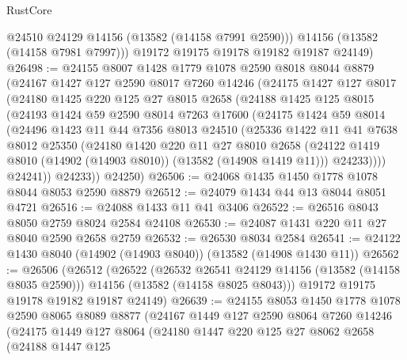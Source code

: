 \begin{lexlean}{RustCore}
\begin{coremodule}
          @24510
          @24129
          @14156
          (@13582 (@14158 @7991 @2590)))
        @14156
        (@13582 (@14158 @7981 @7997)))
      @19172
      @19175
      @19178
      @19182
      @19187
      @24149)
@26498 := @24155
    @8007
    @1428
    @1779
    @1078
    @2590
    @8018
    @8044
    @8879
    (@24167
      @1427
      @127
      @2590
      @8017
      @7260
      @14246
      (@24175
        @1427
        @127
        @8017
        (@24180
          @1425
          @220
          @125
          @27
          @8015
          @2658
          (@24188
            @1425
            @125
            @8015
            (@24193
              @1424
              @59
              @2590
              @8014
              @7263
              @17600
              (@24175
                @1424
                @59
                @8014
                (@24496
                  @1423
                  @11
                  @44
                  @7356
                  @8013
                  @24510
                  (@25336
                    @1422
                    @11
                    @41
                    @7638
                    @8012
                    @25350
                    (@24180
                      @1420
                      @220
                      @11
                      @27
                      @8010
                      @2658
                      (@24122 @1419 @8010 (@14902 (@14903 @8010)) (@13582 (@14908 @1419 @11)))
                      @24233))))
              @24241))
          @24233))
      @24250)
@26506 := @24068 @1435 @1450 @1778 @1078 @8044 @8053 @2590 @8879
@26512 := @24079 @1434 @44 @13 @8044 @8051 @4721
@26516 := @24088 @1433 @11 @41 @3406
@26522 := @26516 @8043 @8050 @2759 @8024 @2584 @24108
@26530 := @24087 @1431 @220 @11 @27 @8040 @2590 @2658 @2759
@26532 := @26530 @8034 @2584
@26541 := @24122 @1430 @8040 (@14902 (@14903 @8040)) (@13582 (@14908 @1430 @11))
@26562 := @26506
    (@26512
      (@26522
        (@26532 @26541 @24129 @14156 (@13582 (@14158 @8035 @2590)))
        @14156
        (@13582 (@14158 @8025 @8043)))
      @19172
      @19175
      @19178
      @19182
      @19187
      @24149)
@26639 := @24155
    @8053
    @1450
    @1778
    @1078
    @2590
    @8065
    @8089
    @8877
    (@24167
      @1449
      @127
      @2590
      @8064
      @7260
      @14246
      (@24175
        @1449
        @127
        @8064
        (@24180
          @1447
          @220
          @125
          @27
          @8062
          @2658
          (@24188
            @1447
            @125

\end{coremodule}
\end{lexlean}
